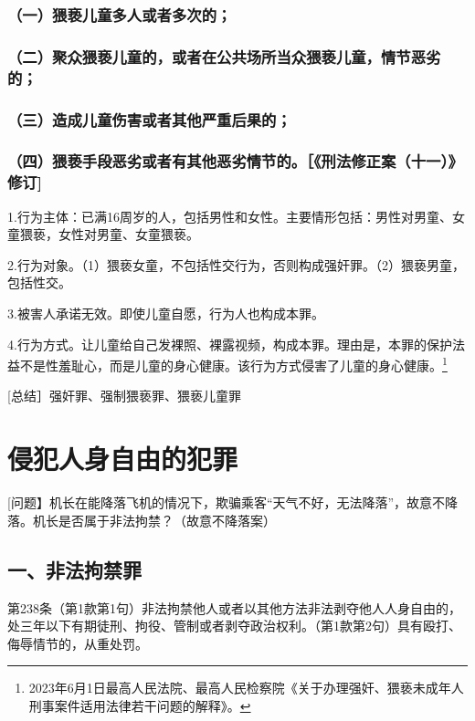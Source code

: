 \subsubsection*{（一）猥亵儿童多人或者多次的；}

\subsubsection*{（二）聚众猥亵儿童的，或者在公共场所当众猥亵儿童，情节恶劣的；}

\subsubsection*{（三）造成儿童伤害或者其他严重后果的；}

\subsubsection*{（四）猥亵手段恶劣或者有其他恶劣情节的。［《刑法修正案（十一）》修订]}

1.行为主体：已满16周岁的人，包括男性和女性。主要情形包括：男性对男童、女童猥亵，女性对男童、女童猥亵。

2.行为对象。（1）猥亵女童，不包括性交行为，否则构成强奸罪。（2）猥亵男童，包括性交。

3.被害人承诺无效。即使儿童自愿，行为人也构成本罪。

4.行为方式。让儿童给自己发裸照、裸露视频，构成本罪。理由是，本罪的保护法益不是性羞耻心，而是儿童的身心健康。该行为方式侵害了儿童的身心健康。\footnote{2023年6月1日最高人民法院、最高人民检察院《关于办理强奸、猥亵未成年人刑事案件适用法律若干问题的解释》。}

[总结］强奸罪、强制猥亵罪、猥亵儿童罪


\section{侵犯人身自由的犯罪}

[问题】机长在能降落飞机的情况下，欺骗乘客“天气不好，无法降落”，故意不降落。机长是否属于非法拘禁？（故意不降落案）

\subsection*{一、非法拘禁罪}

第238条（第1款第1句）非法拘禁他人或者以其他方法非法剥夺他人人身自由的，处三年以下有期徒刑、拘役、管制或者剥夺政治权利。（第1款第2句）具有殴打、侮辱情节的，从重处罚。

